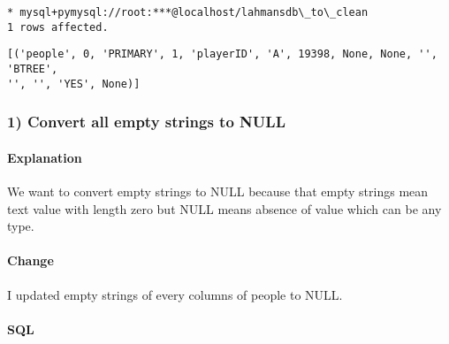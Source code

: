 \documentclass[11pt]{article}
\makeatletter
\newcommand{\boxspacing}{\kern\kvtcb@left@rule\kern\kvtcb@boxsep}
\newcommand{\prompt}[4]{
        {\ttfamily\llap{{\color{#2}[#3]:\hspace{3pt}#4}}\vspace{-\baselineskip}}
    }
\makeatother
\begin{document}
    \begin{Verbatim}[commandchars=\\\{\}]
 * mysql+pymysql://root:***@localhost/lahmansdb\_to\_clean
1 rows affected.
    \end{Verbatim}

            \begin{tcolorbox}[breakable, size=fbox, boxrule=.5pt, pad at break*=1mm, opacityfill=0]
\prompt{Out}{outcolor}{4}{\boxspacing}
\begin{Verbatim}[commandchars=\\\{\}]
[('people', 0, 'PRIMARY', 1, 'playerID', 'A', 19398, None, None, '', 'BTREE',
'', '', 'YES', None)]
\end{Verbatim}
\end{tcolorbox}
        
    \hypertarget{convert-all-empty-strings-to-null}{%
\subsubsection{1) Convert all empty strings to
NULL}\label{convert-all-empty-strings-to-null}}

    \hypertarget{explanation}{%
\paragraph{Explanation}\label{explanation}}

    We want to convert empty strings to NULL because that empty strings mean
text value with length zero but NULL means absence of value which can be
any type.

    \hypertarget{change}{%
\paragraph{Change}\label{change}}

    I updated empty strings of every columns of people to NULL.

    \hypertarget{sql}{%
\paragraph{SQL}\label{sql}}
\end{document}
